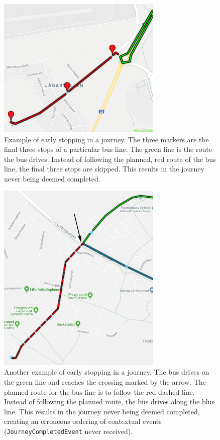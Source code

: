 \begin{figure}[!ht]
    \centering
    \includegraphics[width=0.7\textwidth]{figures/edge_case_early_quit}
    \caption[Example of early stopping in a journey]
    {\small Example of early stopping in a journey.
    The three markers are the final three stops of a particular bus line.
    The green line is the route the bus drives.
    Instead of following the planned, red route of the bus line, the final three stops are skipped.
    This results in the journey never being deemed completed.}
    \label{fig:human-error-early-stopping-1}
\end{figure}

\begin{figure}[!ht]
        \centering
        \includegraphics[width=0.7\textwidth]{figures/lazy_driver_2}
        \caption[Another example of early stopping in a journey]
        {\small Another example of early stopping in a journey.
        The bus drives on the green line and reaches the crossing marked by the arrow.
        The planned route for the bus line is to follow the red dashed line.
        Instead of following the planned route, the bus drives along the blue line.
        This results in the journey never being deemed completed, creating an erroneous ordering of contextual events (\texttt{JourneyCompletedEvent} never received).}
        \label{fig:human-error-early-stopping-2}
\end{figure}


